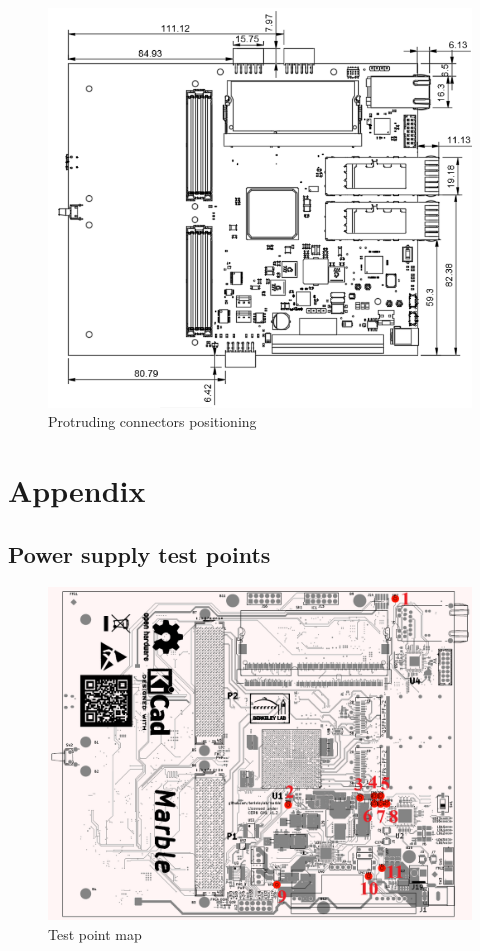 \documentclass[12pt,oneside,a4]{article}
\begin{document}
\begin{figure}[H]
\begin{center}
\includegraphics[width=1\linewidth]{connectors.png}
 \caption{Protruding connectors positioning}\label{connectors}
\end{center}
\end{figure}

\section{Appendix}
\subsection{Power supply test points}

\begin{figure}[H]
\begin{center}
\includegraphics[width=1\linewidth]{testpointsnumb.png}
 \caption{Test point map}\label{testpoints}
\end{center}
\end{figure}
\end{document}
